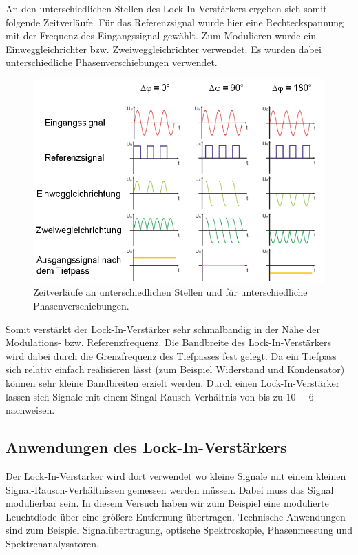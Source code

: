 \documentclass{scrartcl}						%
\begin{document}
	An den unterschiedlichen Stellen des Lock-In-Verstärkers ergeben sich somit folgende Zeitverläufe. Für das Referenzsignal wurde hier eine Rechteckspannung mit der Frequenz des Eingangssignal gewählt. Zum Modulieren wurde ein Einweggleichrichter bzw. Zweiweggleichrichter verwendet. Es wurden dabei unterschiedliche Phasenverschiebungen verwendet.

	\begin{figure}[h!]
		\centering
		\includegraphics[scale=0.4]{Signale}
		\caption{Zeitverläufe an unterschiedlichen Stellen und für unterschiedliche Phasenverschiebungen.}
	\end{figure}
		
	Somit verstärkt der Lock-In-Verstärker sehr schmalbandig in der Nähe der Modulations- bzw. Referenzfrequenz. Die Bandbreite des Lock-In-Verstärkers wird dabei durch die Grenzfrequenz des Tiefpasses fest gelegt. Da ein Tiefpass sich relativ einfach realisieren lässt (zum Beispiel Widerstand und Kondensator) können sehr kleine Bandbreiten erzielt werden. Durch einen Lock-In-Verstärker lassen sich Signale mit einem Singal-Rausch-Verhältnis von bis zu $ 10^-{-6} $ nachweisen.	
	
	\subsection{Anwendungen des Lock-In-Verstärkers}
	Der Lock-In-Verstärker wird dort verwendet wo kleine Signale mit einem kleinen Signal-Rausch-Verhältnissen gemessen werden müssen. Dabei muss das Signal modulierbar sein. In diesem Versuch haben wir zum Beispiel eine modulierte Leuchtdiode über eine größere Entfernung übertragen. Technische Anwendungen sind zum Beispiel Signalübertragung, optische Spektroskopie, Phasenmessung und Spektrenanalysatoren. 
	
\end{document}
